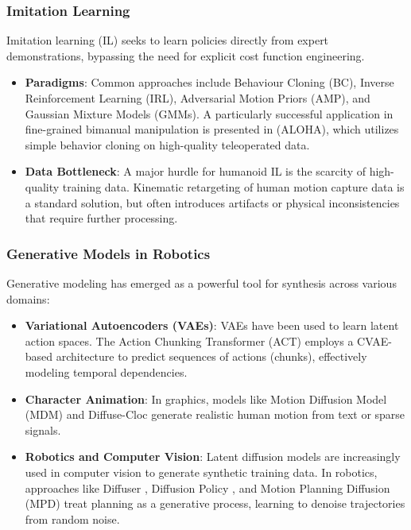\subsubsection{Imitation Learning}
Imitation learning (IL) seeks to learn policies directly from expert demonstrations, bypassing the need for explicit cost function engineering.
\begin{itemize}
    \item \textbf{Paradigms}: Common approaches include Behaviour Cloning (BC), Inverse Reinforcement Learning (IRL), Adversarial Motion Priors (AMP), and Gaussian Mixture Models (GMMs). A particularly successful application in fine-grained bimanual manipulation is presented in \cite{zhao2023learningfinegrainedbimanualmanipulation} (ALOHA), which utilizes simple behavior cloning on high-quality teleoperated data.
    \item \textbf{Data Bottleneck}: A major hurdle for humanoid IL is the scarcity of high-quality training data. Kinematic retargeting of human motion capture data is a standard solution, but often introduces artifacts or physical inconsistencies that require further processing.
\end{itemize}

\subsubsection{Generative Models in Robotics}
Generative modeling has emerged as a powerful tool for synthesis across various domains:
\begin{itemize}
    \item \textbf{Variational Autoencoders (VAEs)}: VAEs have been used to learn latent action spaces. The Action Chunking Transformer (ACT) \cite{zhao2023learningfinegrainedbimanualmanipulation} employs a CVAE-based architecture to predict sequences of actions (chunks), effectively modeling temporal dependencies.
    \item \textbf{Character Animation}: In graphics, models like Motion Diffusion Model (MDM) and Diffuse-Cloc generate realistic human motion from text or sparse signals.
    \item \textbf{Robotics and Computer Vision}: Latent diffusion models are increasingly used in computer vision to generate synthetic training data. In robotics, approaches like Diffuser \cite{janner2022planningdiffusionflexiblebehavior}, Diffusion Policy \cite{chi2023diffusion}, and Motion Planning Diffusion (MPD) \cite{carvalho2023motion} treat planning as a generative process, learning to denoise trajectories from random noise.
\end{itemize}

